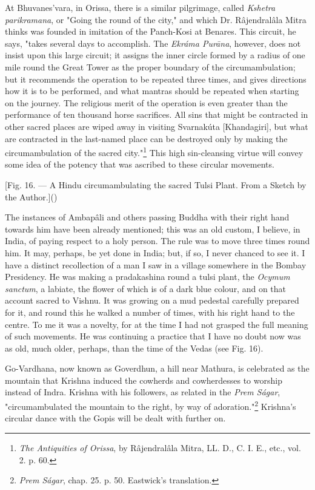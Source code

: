 \documentclass[a4paper, 11pt, oneside, polutonikogreek, english]{article}
\begin{document}
At Bhuvanes'vara, in Orissa, there is a similar pilgrimage, called \emph{Kshetra parikramana}, or "Going the round of the city," and which Dr. Râjendralâla Mitra thinks was founded in imitation of the Panch-Kosi at Benares. This circuit, he says, "takes several days to accomplish. The \emph{Ekráma Purāna}, however, does not insist upon this large circuit; it assigns the inner circle formed by a radius of one mile round the Great Tower as the proper boundary of the circumambulation; but it recommends the operation to be repeated three times, and gives directions how it is to be performed, and what mantras should be repeated when starting on the journey. The religious merit of the operation is even greater than the performance of ten thousand horse sacrifices. All sins that might be contracted in other sacred places are wiped away in visiting Svarnakúta [Khandagiri], but what are contracted in the last-named place can be destroyed only by making the circumambulation of the sacred city."\footnote{\emph{The Antiquities of Orissa}, by Râjendralâla Mitra, LL. D., C. I. E., etc., vol. 2. p. 60.} This high sin-cleansing virtue will convey some idea of the potency that was ascribed to these circular movements.

[Fig. 16. --- A Hindu circumambulating the sacred Tulsi Plant. From a Sketch by the Author.]()

The instances of Ambapâli and others passing Buddha with their right hand towards him have been already mentioned; this was an old custom, I believe, in India, of paying respect to a holy person. The rule was to move three times round him. It may, perhaps, be yet done in India; but, if so, I never chanced to see it. I have a distinct recollection of a man I saw in a village somewhere in the Bombay Presidency. He was making a pradakashina round a tulsi plant, the \emph{Ocymum sanctum}, a labiate, the flower of which is of a dark blue colour, and on that account sacred to Vishnu. It was growing on a mud pedestal carefully prepared for it, and round this he walked a number of times, with his right hand to the centre. To me it was a novelty, for at the time I had not grasped the full meaning of such movements. He was continuing a practice that I have no doubt now was as old, much older, perhaps, than the time of the Vedas (see Fig. 16).

Go-Vardhana, now known as Goverdhun, a hill near Mathura, is celebrated as the mountain that Krishna induced the cowherds and cowherdesses to worship instead of Indra. Krishna with his followers, as related in the \emph{Prem Ságar}, "circumambulated the mountain to the right, by way of adoration."\footnote{\emph{Prem Ságar}, chap. 25. p. 50. Eastwick's translation.} Krishna's circular dance with the Gopis will be dealt with further on.
\end{document}
